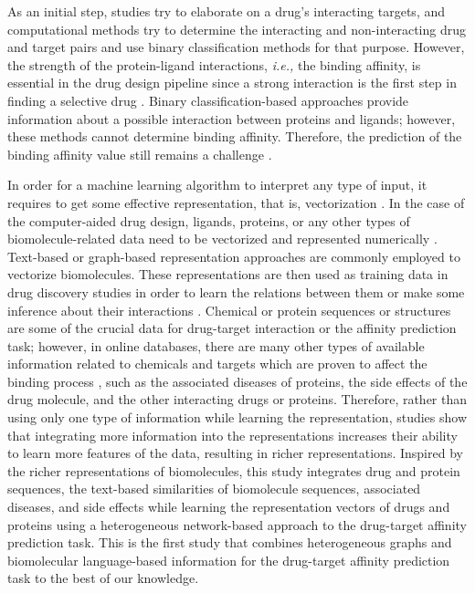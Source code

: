 As an initial step, studies try to elaborate on a drug's interacting targets, and computational methods try to determine the interacting and non-interacting drug and target pairs and use binary classification methods \cite{yamanishi2010drug, liu2016neighborhood, nascimento2016multiple, keum2017self, greenside2017prediction} for that purpose. However, the strength of the protein-ligand interactions, \textit{i.e.,} the binding affinity, is essential in the drug design pipeline since a strong interaction is the first step in finding a selective drug \cite{kawasaki2011finding}. Binary classification-based approaches provide information about a possible interaction between proteins and ligands; however, these methods cannot determine binding affinity. Therefore, the prediction of the binding affinity value still remains a challenge \cite{ozturk2018deepdta}. 

In order for a machine learning algorithm to interpret any type of input, it requires to get some effective representation, that is, vectorization \cite{mcculloch1943logical}. In the case of the computer-aided drug design, ligands, proteins, or any other types of biomolecule-related data need to be vectorized and represented numerically \cite{lecun2015deep}. Text-based or graph-based representation approaches are commonly employed to vectorize biomolecules. These representations are then used as training data in drug discovery studies in order to learn the relations between them or make some inference about their interactions \cite{osman2020graph,jiang2021could, jin2021embeddti,shatkay2015text}. Chemical or protein sequences or structures are some of the crucial data for drug-target interaction or the affinity prediction task; however, in online databases, there are many other types of available information related to chemicals and targets which are proven to affect the binding process \cite{kastritis2013binding, wang2020predicting}, such as the associated diseases of proteins, the side effects of the drug molecule, and the other interacting drugs or proteins. Therefore, rather than using only one type of information while learning the representation, studies show that integrating more information into the representations increases their ability to learn more features \cite{ling2017integrating, wang2017integrating, luo2017network, moon2021learning} of the data, resulting in richer representations. Inspired by the richer representations of biomolecules, this study integrates drug and protein sequences, the text-based similarities of biomolecule sequences, associated diseases, and side effects while learning the representation vectors of drugs and proteins using a heterogeneous network-based approach to the drug-target affinity prediction task. This is the first study that combines heterogeneous graphs and biomolecular language-based information for the drug-target affinity prediction task to the best of our knowledge. 

